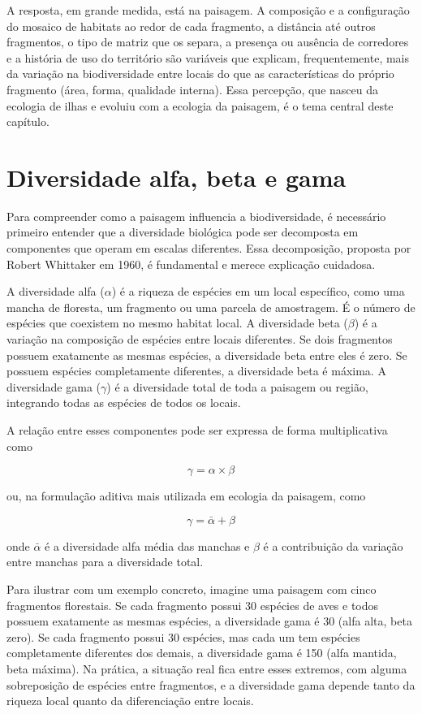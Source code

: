 \documentclass[
  portuguese,
  11pt,
  a4paper,
  open=any]{scrbook}
\begin{document}
A resposta, em grande medida, está na paisagem. A composição e a
configuração do mosaico de habitats ao redor de cada fragmento, a
distância até outros fragmentos, o tipo de matriz que os separa, a
presença ou ausência de corredores e a história de uso do território são
variáveis que explicam, frequentemente, mais da variação na
biodiversidade entre locais do que as características do próprio
fragmento (área, forma, qualidade interna). Essa percepção, que nasceu
da ecologia de ilhas e evoluiu com a ecologia da paisagem, é o tema
central deste capítulo.

\section{Diversidade alfa, beta e
gama}\label{diversidade-alfa-beta-e-gama}

Para compreender como a paisagem influencia a biodiversidade, é
necessário primeiro entender que a diversidade biológica pode ser
decomposta em componentes que operam em escalas diferentes. Essa
decomposição, proposta por Robert Whittaker em 1960, é fundamental e
merece explicação cuidadosa.

A diversidade alfa (\(\alpha\)) é a riqueza de espécies em um local
específico, como uma mancha de floresta, um fragmento ou uma parcela de
amostragem. É o número de espécies que coexistem no mesmo habitat local.
A diversidade beta (\(\beta\)) é a variação na composição de espécies
entre locais diferentes. Se dois fragmentos possuem exatamente as mesmas
espécies, a diversidade beta entre eles é zero. Se possuem espécies
completamente diferentes, a diversidade beta é máxima. A diversidade
gama (\(\gamma\)) é a diversidade total de toda a paisagem ou região,
integrando todas as espécies de todos os locais.

A relação entre esses componentes pode ser expressa de forma
multiplicativa como

\[
\gamma = \alpha \times \beta
\]

ou, na formulação aditiva mais utilizada em ecologia da paisagem, como

\[
\gamma = \bar{\alpha} + \beta
\]

onde \(\bar{\alpha}\) é a diversidade alfa média das manchas e \(\beta\)
é a contribuição da variação entre manchas para a diversidade total.

Para ilustrar com um exemplo concreto, imagine uma paisagem com cinco
fragmentos florestais. Se cada fragmento possui 30 espécies de aves e
todos possuem exatamente as mesmas espécies, a diversidade gama é 30
(alfa alta, beta zero). Se cada fragmento possui 30 espécies, mas cada
um tem espécies completamente diferentes dos demais, a diversidade gama
é 150 (alfa mantida, beta máxima). Na prática, a situação real fica
entre esses extremos, com alguma sobreposição de espécies entre
fragmentos, e a diversidade gama depende tanto da riqueza local quanto
da diferenciação entre locais.
\end{document}

